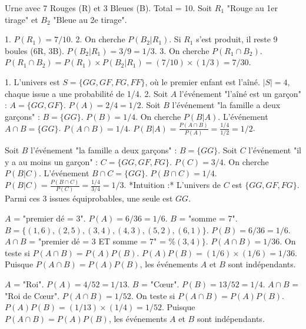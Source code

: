 \begin{correctionbox}
Urne avec 7 Rouges (R) et 3 Bleues (B). Total = 10.
Soit $R_1$ "Rouge au 1er tirage" et $B_2$ "Bleue au 2e tirage".

1.  $P(R_1) = 7/10$.
2.  On cherche $P(B_2|R_1)$. Si $R_1$ s'est produit, il reste 9 boules (6R, 3B).
    $P(B_2|R_1) = 3/9 = 1/3$.
3.  On cherche $P(R_1 \cap B_2)$.
    $P(R_1 \cap B_2) = P(R_1) \times P(B_2|R_1) = (7/10) \times (1/3) = 7/30$.
\end{correctionbox}

\begin{correctionbox}
1.  L'univers est $S = \{GG, GF, FG, FF\}$, où le premier enfant est l'aîné. $|S|=4$, chaque issue a une probabilité de 1/4.
2.  Soit $A$ l'événement "l'aîné est un garçon" : $A = \{GG, GF\}$. $P(A) = 2/4 = 1/2$.
    Soit $B$ l'événement "la famille a deux garçons" : $B = \{GG\}$. $P(B) = 1/4$.
    On cherche $P(B|A)$. L'événement $A \cap B = \{GG\}$. $P(A \cap B) = 1/4$.
    $P(B|A) = \frac{P(A \cap B)}{P(A)} = \frac{1/4}{1/2} = 1/2$.
\end{correctionbox}

\begin{correctionbox}
Soit $B$ l'événement "la famille a deux garçons" : $B = \{GG\}$.
Soit $C$ l'événement "il y a au moins un garçon" : $C = \{GG, GF, FG\}$. $P(C) = 3/4$.
On cherche $P(B|C)$.
L'événement $B \cap C = \{GG\}$. $P(B \cap C) = 1/4$.
$P(B|C) = \frac{P(B \cap C)}{P(C)} = \frac{1/4}{3/4} = 1/3$.
*Intuition :* L'univers de $C$ est $\{GG, GF, FG\}$. Parmi ces 3 issues équiprobables, une seule est $GG$.
\end{correctionbox}


\begin{correctionbox}
$A$ = "premier dé = 3". $P(A) = 6/36 = 1/6$.
$B$ = "somme = 7". $B = \{(1,6), (2,5), (3,4), (4,3), (5,2), (6,1)\}$. $P(B) = 6/36 = 1/6$.
$A \cap B$ = "premier dé = 3 ET somme = 7" = $\%(3,4)\}$. $P(A \cap B) = 1/36$.
On teste si $P(A \cap B) = P(A)P(B)$.
$P(A)P(B) = (1/6) \times (1/6) = 1/36$.
Puisque $P(A \cap B) = P(A)P(B)$, les événements $A$ et $B$ sont indépendants.
\end{correctionbox}

\begin{correctionbox}
$A$ = "Roi". $P(A) = 4/52 = 1/13$.
$B$ = "Cœur". $P(B) = 13/52 = 1/4$.
$A \cap B$ = "Roi de Cœur". $P(A \cap B) = 1/52$.
On teste si $P(A \cap B) = P(A)P(B)$.
$P(A)P(B) = (1/13) \times (1/4) = 1/52$.
Puisque $P(A \cap B) = P(A)P(B)$, les événements $A$ et $B$ sont indépendants.
\end{correctionbox}

